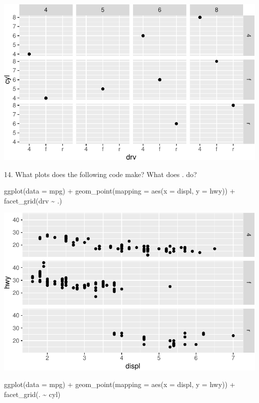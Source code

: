 \documentclass[
  letterpaper,
  DIV=11,
  numbers=noendperiod]{scrreprt}
\newenvironment{Shaded}{\begin{snugshade}}{\end{snugshade}}
\newcommand{\AttributeTok}[1]{\textcolor[rgb]{0.40,0.45,0.13}{#1}}
\newcommand{\FunctionTok}[1]{\textcolor[rgb]{0.28,0.35,0.67}{#1}}
\newcommand{\NormalTok}[1]{\textcolor[rgb]{0.00,0.23,0.31}{#1}}
\newcommand{\SpecialCharTok}[1]{\textcolor[rgb]{0.37,0.37,0.37}{#1}}
\begin{document}
\includegraphics{Beginning_Data_Visualization_files/figure-pdf/Ex13-1.pdf}

14. What plots does the following code make? What does . do?

\begin{Shaded}
\begin{Highlighting}[]
\FunctionTok{ggplot}\NormalTok{(}\AttributeTok{data =}\NormalTok{ mpg) }\SpecialCharTok{+} 
  \FunctionTok{geom\_point}\NormalTok{(}\AttributeTok{mapping =} \FunctionTok{aes}\NormalTok{(}\AttributeTok{x =}\NormalTok{ displ, }\AttributeTok{y =}\NormalTok{ hwy)) }\SpecialCharTok{+}
  \FunctionTok{facet\_grid}\NormalTok{(drv }\SpecialCharTok{\textasciitilde{}}\NormalTok{ .)}
\end{Highlighting}
\end{Shaded}

\includegraphics{Beginning_Data_Visualization_files/figure-pdf/Ex 14-1.pdf}

\begin{Shaded}
\begin{Highlighting}[]
\FunctionTok{ggplot}\NormalTok{(}\AttributeTok{data =}\NormalTok{ mpg) }\SpecialCharTok{+} 
  \FunctionTok{geom\_point}\NormalTok{(}\AttributeTok{mapping =} \FunctionTok{aes}\NormalTok{(}\AttributeTok{x =}\NormalTok{ displ, }\AttributeTok{y =}\NormalTok{ hwy)) }\SpecialCharTok{+}
 \FunctionTok{facet\_grid}\NormalTok{(. }\SpecialCharTok{\textasciitilde{}}\NormalTok{ cyl)}
\end{Highlighting}
\end{Shaded}
\end{document}
